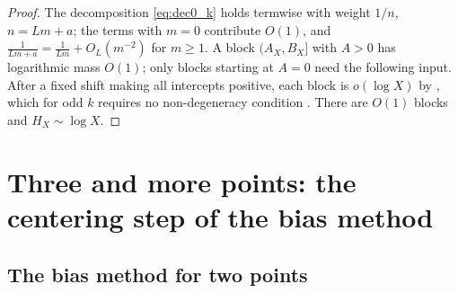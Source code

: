 \begin{proof}
The decomposition \eqref{eq:dec0_k} holds termwise with weight $1/n$, $n=Lm+a$; the terms with $m=0$ contribute $O(1)$, and $\frac1{Lm+a}=\frac1{Lm}+O_L(m^{-2})$ for $m\ge1$. A block $(A_X,B_X]$ with $A>0$ has logarithmic mass $O(1)$; only blocks starting at $A=0$ need the following input. After a fixed shift making all intercepts positive, each block is $o(\log X)$ by \cite[Theorem~1.1, p.~2]{TaoTeravainen2018}, which for odd $k$ requires no non-degeneracy condition \cite[Remark~1.2, p.~2]{TaoTeravainen2018}. There are $O(1)$ blocks and $H_X\sim\log X$.
\end{proof}


\section{Three and more points: the centering step of the bias method}
\label{sec:three}

\subsection{The bias method for two points}
\label{subsec:bias}

